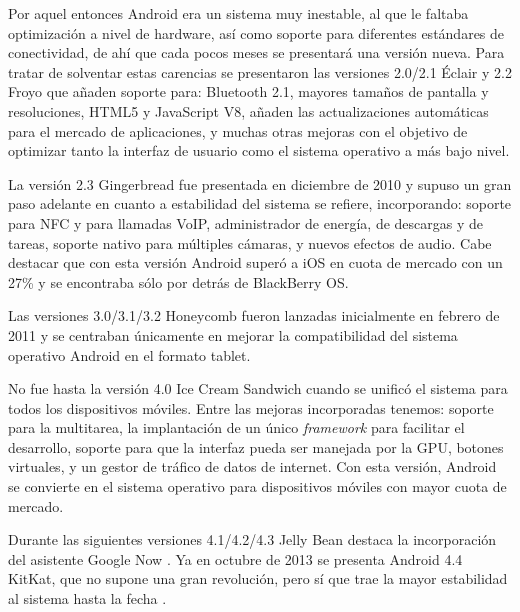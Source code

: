 Por aquel entonces Android era un sistema muy inestable, al que le faltaba optimización a nivel de hardware, así como soporte para diferentes estándares de conectividad, de ahí que cada pocos meses se presentará una versión nueva. Para tratar de solventar estas carencias se presentaron las versiones 2.0/2.1 Éclair y 2.2 Froyo que añaden soporte para: Bluetooth 2.1, mayores tamaños de pantalla y resoluciones, HTML5 y JavaScript V8, añaden las actualizaciones automáticas para el mercado de aplicaciones, y muchas otras mejoras con el objetivo de optimizar tanto la interfaz de usuario como el sistema operativo a más bajo nivel.

La versión 2.3 Gingerbread fue presentada en diciembre de 2010 y supuso un gran paso adelante en cuanto a estabilidad del sistema se refiere, incorporando: soporte para \gls{NFC} y para llamadas \gls{VoIP}, administrador de energía, de descargas y de tareas, soporte nativo para múltiples cámaras, y nuevos efectos de audio. Cabe destacar que con esta versión Android superó a iOS en cuota de mercado con un 27\% y se encontraba sólo por detrás de BlackBerry OS.

Las versiones 3.0/3.1/3.2 Honeycomb fueron lanzadas inicialmente en febrero de 2011 y se centraban únicamente en mejorar la compatibilidad del sistema operativo Android en el formato tablet.

No fue hasta la versión 4.0 Ice Cream Sandwich cuando se unificó el sistema para todos los dispositivos móviles. Entre las mejoras incorporadas tenemos: soporte para la multitarea, la implantación de un único \textit{framework} para facilitar el desarrollo, soporte para que la interfaz pueda ser manejada por la \gls{GPU}, botones virtuales, y un gestor de tráfico de datos de internet. Con esta versión, Android se convierte en el sistema operativo para dispositivos móviles con mayor cuota de mercado.

Durante las siguientes versiones 4.1/4.2/4.3 Jelly Bean destaca la incorporación del asistente Google Now \cite{jelly_bean}. Ya en octubre de 2013 se presenta Android 4.4 KitKat, que no supone una gran revolución, pero sí que trae la mayor estabilidad al sistema hasta la fecha \cite{kitkat}.

